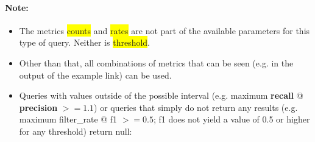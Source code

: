 \documentclass[12pt,a4paper]{article}
\begin{document}
\paragraph{Note: }
\begin{itemize}
\item The metrics \colorbox{yellow}{counts} and \colorbox{yellow}{rates} are not part of the available parameters for this type of query. Neither is \colorbox{yellow}{threshold}. %
\item Other than that, all combinations of metrics that can be seen (e.g. in the output of the example link) can be used. %
\item Queries with values outside of the possible interval (e.g. maximum \textbf{recall} @ \textbf{precision} $>= 1.1$) or queries that simply do not return any results (e.g. maximum filter\_rate @ f1 $>= 0.5$; f1 does not yield a value of 0.5 or higher for any threshold) return null:
\end{itemize}
\end{document}
